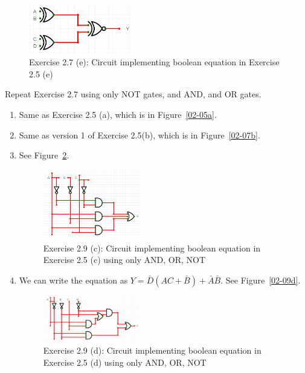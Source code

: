 \documentclass[12pt]{article}
\newenvironment{ex}[2][Exercise]{\begin{trivlist}
		\item[\hskip \labelsep {\bfseries #1}\hskip \labelsep {\bfseries #2.}]}{\end{trivlist}}
\newenvironment{sol}[1][Solution]{\begin{trivlist}
		\item[\hskip \labelsep {\bfseries #1:}]}{\end{trivlist}}
\begin{document}
\begin{sol}
\begin{enumerate}[label=(\alph*)]
		\begin{figure}
			\centering
			\includegraphics[width=0.4\textwidth]{02-07e-circuit}
			\caption{Exercise 2.7 (e): Circuit implementing boolean equation in Exercise 2.5 (e)}
			\label{02-07e}
		\end{figure}
	\end{enumerate}
\end{sol}

\begin{ex}{2.9}
	Repeat Exercise 2.7 using only NOT gates, and AND, and OR gates.
	\begin{enumerate}[label=(\alph*)]
		\item Same as Exercise 2.5 (a), which is in Figure~\ref{02-05a}.
		\item Same as version 1 of Exercise 2.5(b), which is in Figure~\ref{02-07b}.
		\item See Figure~\ref{02-09c}.
		\begin{figure}
			\centering
			\includegraphics[width=0.4\textwidth]{02-09c-circuit}
			\caption{Exercise 2.9 (c): Circuit implementing boolean equation in Exercise 2.5 (c) using only AND, OR, NOT}
			\label{02-09c}
		\end{figure}
		\item We can write the equation as
		$Y=\bar{D}(AC+\bar{B})+\bar{A}\bar{B}$. See Figure~\ref{02-09d}.
		\begin{figure}
			\centering
			\includegraphics[width=0.4\textwidth]{02-09d-circuit}
			\caption{Exercise 2.9 (d): Circuit implementing boolean equation in Exercise 2.5 (d) using only AND, OR, NOT}

\end{figure}
\end{enumerate}
\end{ex}
\end{document}
